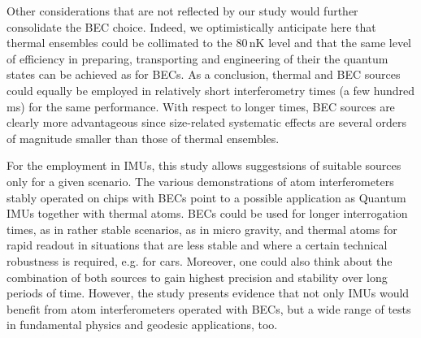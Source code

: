 Other considerations that are not reflected by our study would further consolidate the BEC choice. Indeed, we optimistically anticipate here that thermal ensembles could be collimated to the 80\,nK level and that the same level of efficiency in preparing, transporting and engineering of their the quantum states can be achieved as for BECs.
As a conclusion, thermal and BEC sources could equally be employed in relatively short interferometry times (a few hundred ms) for the same performance. With respect to longer times, BEC sources are clearly more advantageous since size-related systematic effects are several orders of magnitude smaller than those of thermal ensembles.

For the employment in IMUs, this study allows suggestsions of suitable sources only for a given scenario.
The various demonstrations of atom interferometers stably operated on chips with BECs point to a possible application as Quantum IMUs together with thermal atoms.
BECs could be used for longer interrogation times, as in rather stable scenarios, as in micro gravity, and thermal atoms for rapid readout in situations that are less stable and where a certain technical robustness is required, e.g. for cars.
Moreover, one could also think about the combination of both sources to gain highest precision and stability over long periods of time.
However, the study presents evidence that not only IMUs would benefit from atom interferometers operated with BECs, but a wide range of tests in fundamental physics and geodesic applications, too.
%
%